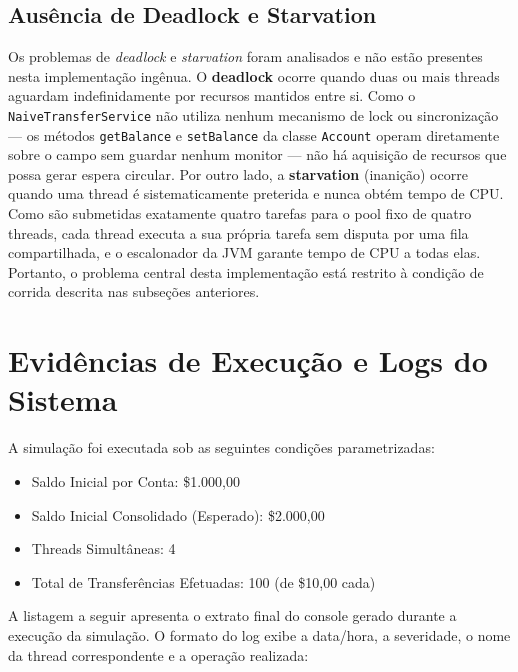\documentclass[12pt,a4paper]{article}
\begin{document}
\subsection{Ausência de Deadlock e Starvation}
Os problemas de \textit{deadlock} e \textit{starvation} foram analisados e não estão presentes nesta implementação ingênua. O \textbf{deadlock} ocorre quando duas ou mais threads aguardam indefinidamente por recursos mantidos entre si. Como o \texttt{NaiveTransferService} não utiliza nenhum mecanismo de lock ou sincronização — os métodos \texttt{getBalance} e \texttt{setBalance} da classe \texttt{Account} operam diretamente sobre o campo sem guardar nenhum monitor — não há aquisição de recursos que possa gerar espera circular. Por outro lado, a \textbf{starvation} (inanição) ocorre quando uma thread é sistematicamente preterida e nunca obtém tempo de CPU. Como são submetidas exatamente quatro tarefas para o pool fixo de quatro threads, cada thread executa a sua própria tarefa sem disputa por uma fila compartilhada, e o escalonador da JVM garante tempo de CPU a todas elas. Portanto, o problema central desta implementação está restrito à condição de corrida descrita nas subseções anteriores.

\section{Evidências de Execução e Logs do Sistema}

\noindent A simulação foi executada sob as seguintes condições parametrizadas:
\begin{itemize}
    \item Saldo Inicial por Conta: \$1.000,00
    \item Saldo Inicial Consolidado (Esperado): \$2.000,00
    \item Threads Simultâneas: 4
    \item Total de Transferências Efetuadas: 100 (de \$10,00 cada)
\end{itemize}

\noindent A listagem a seguir apresenta o extrato final do console gerado durante a execução da simulação. O formato do log exibe a data/hora, a severidade, o nome da thread correspondente e a operação realizada:
\end{document}
